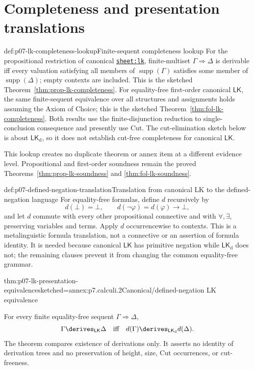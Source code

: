 \section{Completeness and presentation translations}

\begin{hbmethod}{def:p07-lk-completeness-lookup}{Finite-sequent completeness lookup}
For the propositional restriction of canonical
\hyperref[sheet:lk]{\texttt{sheet:lk}}, finite-multiset
\(\Gamma\Rightarrow\Delta\) is derivable iff every valuation satisfying all
members of \(\operatorname{supp}(\Gamma)\) satisfies some member of
\(\operatorname{supp}(\Delta)\); empty contexts are included.  This is the
sketched Theorem~\ref{thm:prop-lk-completeness}.  For equality-free
first-order canonical \(\mathsf{LK}\), the same finite-sequent equivalence
over all structures and assignments holds assuming the Axiom of Choice; this
is the sketched Theorem~\ref{thm:fol-lk-completeness}.  Both results use
the finite-disjunction reduction to single-conclusion consequence and
presently use Cut.  The cut-elimination sketch below is about
\(\mathsf{LK}_{\mathrm d}\), so it does not establish cut-free completeness
for canonical \(\mathsf{LK}\).
\end{hbmethod}

This lookup creates no duplicate theorem or annex item at a different
evidence level.  Propositional and first-order soundness remain the proved
Theorems~\ref{thm:prop-lk-soundness} and
\ref{thm:fol-lk-soundness}.

\begin{hbdefinition}{def:p07-defined-negation-translation}{Translation from canonical LK to the defined-negation language}
For equality-free formulas, define \(d\) recursively by
\[
 d(\bot)=\bot,\qquad d(\neg\varphi)=d(\varphi)\to\bot,
\]
and let \(d\) commute with every other propositional connective and with
\(\forall,\exists\), preserving variables and terms.  Apply \(d\)
occurrencewise to contexts.  This is a metalinguistic formula translation,
not a connective or an assertion of formula identity.  It is needed because
canonical \(\mathsf{LK}\) has primitive negation while
\(\mathsf{LK}_{\mathrm d}\) does not; the remaining clauses prevent it from
changing the common equality-free grammar.
\end{hbdefinition}

\begin{hbtheorem}{thm:p07-lk-presentation-equivalence}{sketched=annex:p7.calculi.2}{Canonical/defined-negation LK equivalence}
\par\noindent
For every finite equality-free sequent \(\Gamma\Rightarrow\Delta\),
\[
 \Gamma\derives_{\mathsf{LK}}\Delta
 \quad\text{iff}\quad
 d(\Gamma)\derives_{\mathsf{LK}_{\mathrm d}}d(\Delta).
\]
The theorem compares existence of derivations only.  It asserts no identity
of derivation trees and no preservation of height, size, Cut occurrences, or
cut-freeness.
\end{hbtheorem}

